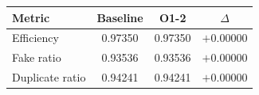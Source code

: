 \renewcommand{\arraystretch}{1.4}
\begin{tabular}{lccc}
\toprule
Metric & Baseline & O1-2 & $\Delta$ \\
\midrule
Efficiency & 0.97350 & 0.97350 & $+0.00000$ \\
\rowcolor{gray!15}
Fake ratio & 0.93536 & 0.93536 & $+0.00000$ \\
Duplicate ratio & 0.94241 & 0.94241 & $+0.00000$ \\
\bottomrule
\end{tabular}
